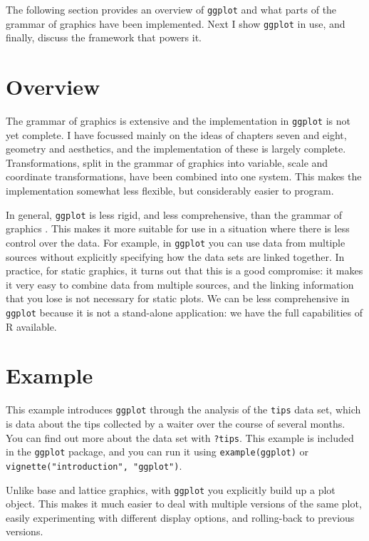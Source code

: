 \documentclass[]{article}
\def \GG {grammar of graphics }
\begin{document}
The following section provides an overview of \texttt{ggplot} and what parts of the \GG have been implemented.  Next I show \texttt{ggplot} in use, and finally, discuss the framework that powers it.

\section{Overview}

The \GG is extensive and the implementation in \texttt{ggplot} is not yet complete.  I have focussed mainly on the ideas of chapters seven and eight, geometry and aesthetics, and the implementation of these is largely complete.  Transformations, split in the \GG into variable, scale and coordinate transformations, have been combined into one system.  This makes the implementation somewhat less flexible, but considerably easier to program.  

In general, \texttt{ggplot} is less rigid, and less comprehensive, than the \GG.  This makes it more suitable for use in a situation where there is less control over the data.   For example, in \texttt{ggplot} you can use data from multiple sources without explicitly specifying how the data sets are linked together.  In practice, for static graphics, it turns out that this is a good compromise: it makes it very easy to combine data from multiple sources, and the linking information that you lose is not necessary for static plots.  We can be less comprehensive in \texttt{ggplot} because it is not a stand-alone application: we have the full capabilities of R available.

\section{Example}

This example introduces \texttt{ggplot} through the analysis of the \texttt{tips} data set, which is data about the tips collected by a waiter over the course of several months.  You can find out more about the data set with \texttt{?tips}. This example is included in the \texttt{ggplot} package, and you can run it using \texttt{example(ggplot)} or \texttt{vignette("introduction", "ggplot")}.

Unlike base and lattice graphics, with \texttt{ggplot} you explicitly build up a plot object.  This makes it much easier to deal with multiple versions of the same plot, easily experimenting with different display options, and rolling-back to previous versions.
\end{document}
